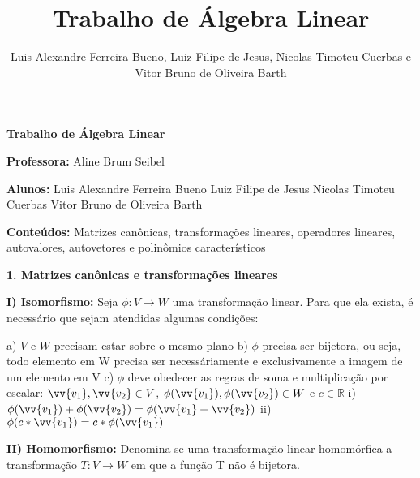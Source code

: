 \documentclass[11pt,a4paper]{article}
\author{Luis Alexandre Ferreira Bueno, Luiz Filipe de Jesus, Nicolas Timoteu Cuerbas e Vitor Bruno de Oliveira Barth}
\title{Trabalho de Álgebra Linear }
\newcommand\tab[1][1.835cm]{\hspace*{#1}}
\newcommand\taba[1][2.55cm]{\hspace*{#1}}
\newcommand\tabb[1][2.2cm]{\hspace*{#1}}
\begin{document}
\begin{center}
\textbf{Trabalho de Álgebra Linear}
\end{center}

\begin{flushleft}

\textbf{Professora: }Aline Brum Seibel\linebreak

\textbf{Alunos: } Luis Alexandre Ferreira Bueno\linebreak 
\tab Luiz Filipe de Jesus\linebreak
\tab Nicolas Timoteu Cuerbas\linebreak
\tab Vitor Bruno de Oliveira Barth\linebreak
	
\textbf{Conteúdos:} Matrizes canônicas, transformações lineares, operadores lineares, autovalores, autovetores e polinômios característicos \linebreak

%
%

\textbf{1. Matrizes canônicas e transformações lineares} \linebreak

\tab \textbf{I) Isomorfismo:} Seja $\phi: V \rightarrow W$ uma transformação linear. Para que ela exista, é necessário que sejam atendidas algumas condições: \linebreak

\tabb a) $V$ e $W$ precisam estar sobre o mesmo plano \linebreak
\tabb b) $\phi$ precisa ser bijetora, ou seja, todo elemento em W precisa ser necessáriamente e exclusivamente a imagem de um elemento em V\linebreak
\tabb c) $\phi$ deve obedecer as regras de soma e multiplicação por escalar: \linebreak
\taba $\vv{v_1}, \vv{v_2} \in V$, $\phi(\vv{v_1}), \phi(\vv{v_2}) \in W$ e $c \in \mathbb{R} $ \linebreak
\taba i) $\phi(\vv{v_1}) + \phi(\vv{v_2}) = \phi(\vv{v_1} + \vv{v_2}) $ \linebreak
\taba ii) $\phi(c*\vv{v_1}) = c*\phi(\vv{v_1}) $ \linebreak

\tab \textbf {II) Homomorfismo:} Denomina-se uma transformação linear homomórfica a transformação  $T: V \rightarrow W$ em que a função T não é bijetora. \linebreak


\end{flushleft}
\end{document}
